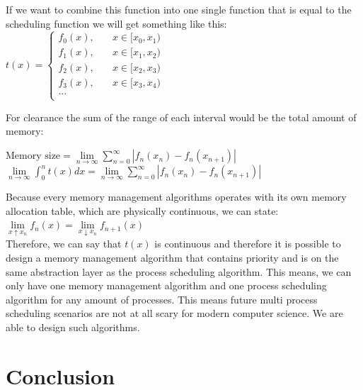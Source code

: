 \documentclass[12pt, reqno]{amsart}
\numberwithin{equation}{section}
\begin{document}
If we want to combine this function into one single function that is equal to the scheduling function we will get something like this:\\
\begin{math}
    t(x) = 
    \begin{cases}
        f_{0}(x), &\quad x \in [x_{0},x_{1}) \\
        f_{1}(x), &\quad x \in [x_{1},x_{2})\\
        f_{2}(x), &\quad x \in [x_{2},x_{3})\\
        f_{3}(x), &\quad x \in [x_{3},x_{4})\\
        \text{...} \\
      \end{cases}
\end{math}

For clearance the sum of the range of each interval would be the total amount of memory: 

\begin{math}
    \text{Memory size} = \lim \limits_{n \to \infty} \sum_{n=0}^{\infty} |f_{n}(x_{n}) - f_{n}(x_{n+1})|
\end{math}\\
\begin{math}
    \lim \limits_{n \to \infty} \int_{0}^{n} t(x) dx = \lim \limits_{n \to \infty} \sum_{n=0}^{\infty} |f_{n}(x_{n}) - f_{n}(x_{n+1})|
\end{math}

Because every memory management algorithms operates with its own memory allocation table, which are physically continuous, we can state:
\begin{math}
    \lim \limits_{x \uparrow x_{n}} f_{n}(x) = \lim \limits_{x \downarrow x_{n}} f_{n+1}(x)
\end{math} \\

Therefore, we can say that $t(x)$ is continuous and therefore it is possible to design a memory management algorithm that contains priority and is 
on the same abstraction layer as the process scheduling algorithm. This means, we can only have one memory management algorithm and one process scheduling algorithm for any amount of processes. 
This means future multi process scheduling scenarios are not at all scary for modern computer science. We are able to design such algorithms.

\section{Conclusion}
\end{document}
